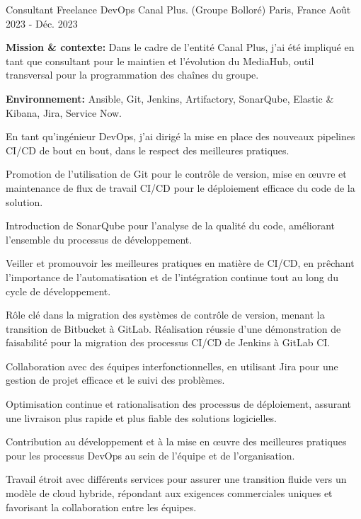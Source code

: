 \begin{cventries}
\cventry
{Consultant Freelance DevOps} %
{Canal Plus. (Groupe Bolloré)} %
{Paris, France} %
{Août 2023 - Déc. 2023} %
{
  \begin{cvitems} %
    \item {\textbf{Mission \& contexte:} Dans le cadre de l'entité Canal Plus, j'ai été impliqué en tant que consultant pour le maintien et l'évolution du MediaHub, outil transversal pour la programmation des chaînes du groupe.}
    \item {\textbf{Environnement:} Ansible, Git, Jenkins, Artifactory, SonarQube, Elastic \& Kibana, Jira, Service Now.}
    \item {En tant qu'ingénieur DevOps, j'ai dirigé la mise en place des nouveaux pipelines CI/CD de bout en bout, dans le respect des meilleures pratiques.}
    \item {Promotion de l'utilisation de Git pour le contrôle de version, mise en œuvre et maintenance de flux de travail CI/CD pour le déploiement efficace du code de la solution.}
    \item {Introduction de SonarQube pour l'analyse de la qualité du code, améliorant l'ensemble du processus de développement.}
    \item {Veiller et promouvoir les meilleures pratiques en matière de CI/CD, en prêchant l'importance de l'automatisation et de l'intégration continue tout au long du cycle de développement.}
    \item {Rôle clé dans la migration des systèmes de contrôle de version, menant la transition de Bitbucket à GitLab. Réalisation réussie d'une démonstration de faisabilité pour la migration des processus CI/CD de Jenkins à GitLab CI.}
    \item {Collaboration avec des équipes interfonctionnelles, en utilisant Jira pour une gestion de projet efficace et le suivi des problèmes.}
    \item {Optimisation continue et rationalisation des processus de déploiement, assurant une livraison plus rapide et plus fiable des solutions logicielles.}
    \item {Contribution au développement et à la mise en œuvre des meilleures pratiques pour les processus DevOps au sein de l'équipe et de l'organisation.}
    \item {Travail étroit avec différents services pour assurer une transition fluide vers un modèle de cloud hybride, répondant aux exigences commerciales uniques et favorisant la collaboration entre les équipes.}
  \end{cvitems}        
}


\end{cventries}
